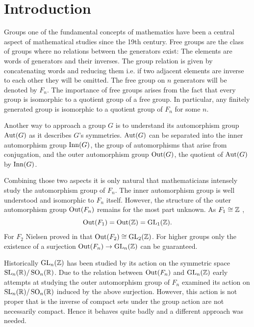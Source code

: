 %

\usepackage{./tikzit/tikzit}
\usepackage[
	sorting=none,
	sortcites=true,
	maxnames=6,
	minnames=6
]{biblatex}


\usepackage[stable]{footmisc}
\usepackage{caption}
\usepackage{subcaption}
\usepackage{listings}
\usepackage{thmtools,thm-restate}
\lstset{
	breakatwhitespace=True,
	breaklines=True,
	tabsize=2,
	extendedchars=True,
	keepspaces=True
}

	

\newpage
\section{Introduction}
Groups one of the fundamental concepts of mathematics have been a central aspect of mathematical studies since the 19th century.
Free groups are the class of groups where no relations between the generators exist: 
The elements are words of generators and their inverses. The group relation is given by concatenating words
and reducing them i.e. if two adjacent elements are inverse to each other they will be omitted.
The free group on $n$ generators will be denoted by $F_{n}$.
The importance of free groups arises from the fact that every group is isomorphic to a quotient group of a free group.
In particular, any finitely generated group is isomorphic to a quotient group of $F_{n}$ for some $n$.

Another way to approach a group $G$ is to understand its automorphism group $\operatorname{Aut}(G)$ as it describes $G$'s symmetries.
$\operatorname{Aut}(G)$ can be separated into the inner automorphism group $\operatorname{Inn}(G)$,
the group of automorphisms that arise from conjugation, and the outer automorphism group $\operatorname{Out}(G)$, the quotient of  $\operatorname{Aut}(G)$ by $\operatorname{Inn}(G)$.

Combining those two aspects it is only natural that mathematicians intensely study the automorphism group of $F_{n}$.
The inner automorphism group is well understood and isomorphic to $F_{n}$ itself.
However, the structure of the outer automorphism group $\operatorname{Out}(F_{n})$ remains for the most part unknown.
As $F_{1} \cong \mathbb{Z}$ ,
\[
	\operatorname{Out}(F_1) = \operatorname{Out}(\mathbb{Z}) = \operatorname{GL}_{1}(\mathbb{Z})
.\] 
For $F_{2}$ Nielsen proved in \cite{nielsen17} that $\operatorname{Out}(F_2) \cong \operatorname{GL}_{2}(\mathbb{Z})$.
For higher groups only the existence of a surjection $\operatorname{Out}(F_{n}) \to \operatorname{GL}_{n}(\mathbb{Z})$ can be guaranteed.

Historically $\operatorname{GL}_{n}(\mathbb{Z})$ has been studied by its action on the symmetric space $\operatorname{SL}_{n}(\mathbb{R}) / \operatorname{SO}_{n}(\mathbb{R})$.
Due to the relation between $\operatorname{Out}(F_{n})$ and $\operatorname{GL}_{n}(\mathbb{Z})$ early attempts at studying the outer automorphism group of $F_{n}$
examined its action on $\operatorname{SL}_{n}(\mathbb{R}) / \operatorname{SO}_{n}(\mathbb{R})$ induced by the above surjection.
However, this action is not proper that is the inverse of compact sets under the group action are not necessarily compact.
Hence it behaves quite badly and a different approach was needed.

